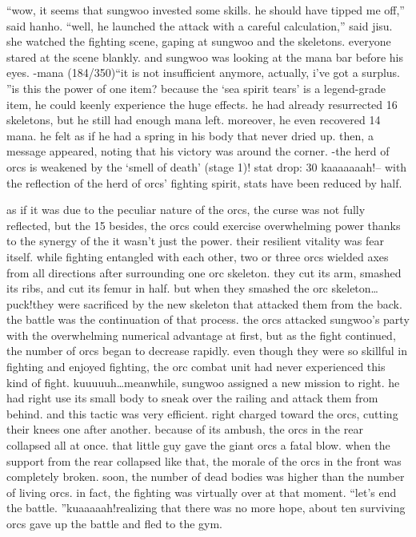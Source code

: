 “wow, it seems that sungwoo invested some skills.
 he should have tipped me off,” said hanho.
“well, he launched the attack with a careful calculation,” said jisu.
she watched the fighting scene, gaping at sungwoo and the skeletons.
 everyone stared at the scene blankly.
and sungwoo was looking at the mana bar before his eyes.
-mana (184/350)“it is not insufficient anymore, actually, i’ve got a surplus.
”is this the power of one item? because the ‘sea spirit tears’ is a legend-grade item, he could keenly experience the huge effects.
he had already resurrected 16 skeletons, but he still had enough mana left.
 moreover, he even recovered 14 mana.
 he felt as if he had a spring in his body that never dried up.
then, a message appeared, noting that his victory was around the corner.
-the herd of orcs is weakened by the ‘smell of death’ (stage 1)! stat drop: 30%
kaaaaaaah!– with the reflection of the herd of orcs’ fighting spirit, stats have been reduced by half.


as if it was due to the peculiar nature of the orcs, the curse was not fully reflected, but the 15%
 besides, the orcs could exercise overwhelming power thanks to the synergy of the it wasn’t just the power.
 their resilient vitality was fear itself.
while fighting entangled with each other, two or three orcs wielded axes from all directions after surrounding one orc skeleton.
they cut its arm, smashed its ribs, and cut its femur in half.
but when they smashed the orc skeleton…puck!they were sacrificed by the new skeleton that attacked them from the back.
 the battle was the continuation of that process.
 the orcs attacked sungwoo’s party with the overwhelming numerical advantage at first, but as the fight continued, the number of orcs began to decrease rapidly.
even though they were so skillful in fighting and enjoyed fighting, the orc combat unit had never experienced this kind of fight.
kuuuuuh…meanwhile, sungwoo assigned a new mission to right.
 he had right use its small body to sneak over the railing and attack them from behind.
and this tactic was very efficient.
right charged toward the orcs, cutting their knees one after another.
 because of its ambush, the orcs in the rear collapsed all at once.
 that little guy gave the giant orcs a fatal blow.
when the support from the rear collapsed like that, the morale of the orcs in the front was completely broken.
 soon, the number of dead bodies was higher than the number of living orcs.
 in fact, the fighting was virtually over at that moment.
“let’s end the battle.
”kuaaaaah!realizing that there was no more hope, about ten surviving orcs gave up the battle and fled to the gym.


 